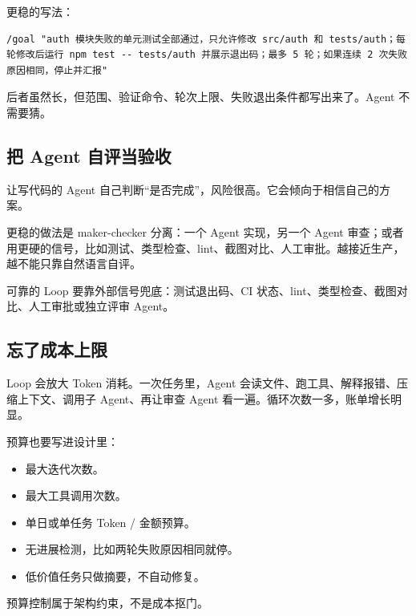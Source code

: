 \documentclass[9pt,a4paper,twocolumn]{ctexart}
\begin{document}
更稳的写法：



\begin{lstlisting}
/goal "auth 模块失败的单元测试全部通过，只允许修改 src/auth 和 tests/auth；每轮修改后运行 npm test -- tests/auth 并展示退出码；最多 5 轮；如果连续 2 次失败原因相同，停止并汇报"
\end{lstlisting}



后者虽然长，但范围、验证命令、轮次上限、失败退出条件都写出来了。Agent 不需要猜。



\subsection*{把 Agent 自评当验收}


让写代码的 Agent 自己判断“是否完成”，风险很高。它会倾向于相信自己的方案。



更稳的做法是 maker-checker 分离：一个 Agent 实现，另一个 Agent 审查；或者用更硬的信号，比如测试、类型检查、lint、截图对比、人工审批。越接近生产，越不能只靠自然语言自评。



可靠的 Loop 要靠外部信号兜底：测试退出码、CI 状态、lint、类型检查、截图对比、人工审批或独立评审 Agent。



\subsection*{忘了成本上限}


Loop 会放大 Token 消耗。一次任务里，Agent 会读文件、跑工具、解释报错、压缩上下文、调用子 Agent、再让审查 Agent 看一遍。循环次数一多，账单增长明显。



预算也要写进设计里：


\begin{itemize}[itemsep=1pt, topsep=2pt]
  \item 最大迭代次数。
  \item 最大工具调用次数。
  \item 单日或单任务 Token / 金额预算。
  \item 无进展检测，比如两轮失败原因相同就停。
  \item 低价值任务只做摘要，不自动修复。
\end{itemize}


预算控制属于架构约束，不是成本抠门。
\end{document}
